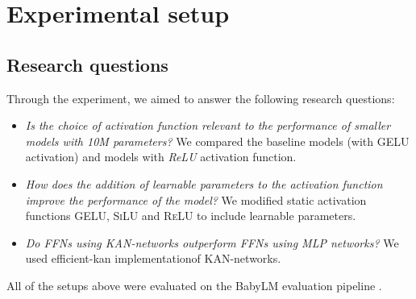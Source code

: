 
\section{Experimental setup} %
\label{sec:experimental_setup}

\subsection{Research questions}
Through the experiment, we aimed to answer the following research questions:
\begin{itemize}
    \item \textit{Is the choice of activation function relevant to the performance of smaller models with 10M parameters?}  We compared the baseline models (with \textsc{GELU} activation) and models with \textit{ReLU} activation function.
    \item \textit{How does the addition of learnable parameters to the activation function improve the performance of the model?} We modified static activation functions \textsc{GELU}, \textsc{SiLU} and \textsc{ReLU} to include learnable parameters.
    \item \textit{Do FFNs using KAN-networks outperform FFNs using MLP networks?} We used efficient-kan implementation\footnotemark[3] of KAN-networks.
\end{itemize}
All of the setups above were evaluated on the BabyLM evaluation pipeline \cite{Warstadt2023}.

